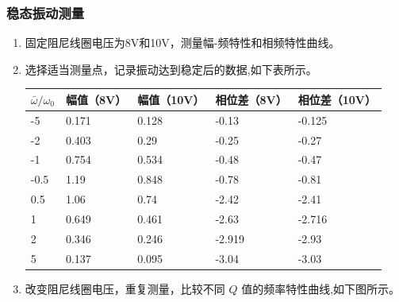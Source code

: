\documentclass[UTF8]{ctexart}
\begin{document}
\subsubsection{稳态振动测量}
\begin{enumerate}
    \item 固定阻尼线圈电压为8V和10V，测量幅-频特性和相频特性曲线。
    \item 选择适当测量点，记录振动达到稳定后的数据,如下表所示。
    \begin{table}[H]
    \centering
    \begin{tabular}{lllll}
    \toprule
    \(\bar{\omega}/\omega_0\)&幅值（8V）&幅值（10V）&相位差（8V）&相位差（10V）\\
    \midrule
    -5&0.171&0.128&-0.13&-0.125\\
    -2&0.403&0.29&-0.25&-0.27\\
    -1&0.754&0.534&-0.48&-0.47\\
    -0.5&1.19&0.848&-0.78&-0.81\\
    0.5&1.06&0.74&-2.42&-2.41\\
    1&0.649&0.461&-2.63&-2.716\\
    2&0.346&0.246&-2.919&-2.93\\
    5&0.137&0.095&-3.04&-3.03\\
    \bottomrule
    \end{tabular}
    \end{table}

    \item 改变阻尼线圈电压，重复测量，比较不同 $Q$ 值的频率特性曲线,如下图所示。

\end{enumerate}
\end{document}
